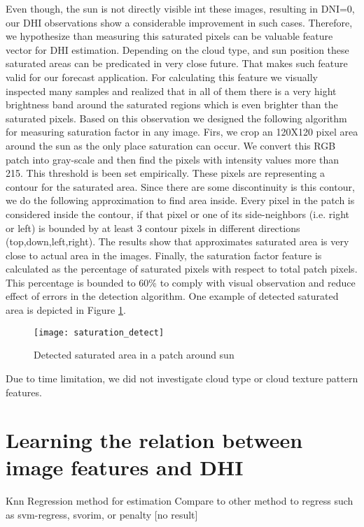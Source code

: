 Even though, the sun is not directly visible int these images, resulting in DNI=0, our DHI observations show a considerable improvement in such cases. Therefore, we hypothesize than measuring this saturated pixels can be valuable feature vector for DHI estimation. Depending on the cloud type, and sun position these saturated areas can be predicated in very close future. That makes such feature valid for our forecast application. For calculating this feature we visually inspected many samples and realized that in all of them there is a very hight brightness band around the saturated regions which is even brighter than the saturated pixels. Based on this observation we designed the following algorithm for measuring saturation factor in any image. Firs, we crop an 120X120 pixel area around the sun as the only place saturation can occur. We convert this RGB patch into gray-scale and then find the pixels with intensity values more than 215. This threshold is been set empirically. These pixels are representing a contour for the saturated area. Since there are some discontinuity is this contour, we do the following approximation to find area inside. Every pixel in the patch is considered inside the contour, if that pixel or one of its side-neighbors (i.e. right or left) is bounded by at least 3 contour pixels in different directions (top,down,left,right). The results show that approximates saturated area is very close to actual area in the images. Finally, the saturation factor feature is calculated as the percentage of saturated pixels with respect to total patch pixels. This percentage is bounded to 60\% to comply with visual observation and reduce effect of errors in the detection algorithm. One example of detected saturated area is depicted in Figure \ref{fig:saturated_result_example}.

\begin{figure}[h]
\caption{Detected saturated area in a patch around sun}
\label{fig:saturated_result_example}
\texttt{[image: saturation\_detect]}
\centering
\end{figure}

Due to time limitation, we did not investigate cloud type or cloud texture pattern features.


\section{Learning the relation between image features and DHI}

Knn Regression method for estimation
Compare to other method to regress such as svm-regress, svorim, or penalty [no result]



